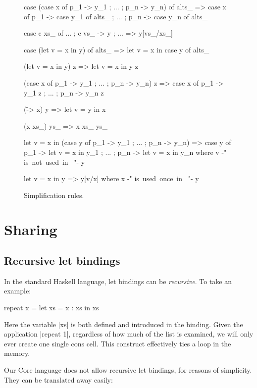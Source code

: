 \begin{figure}
\begin{code}
case (case x of {p_1 -> y_1 ; ... ; p_n -> y_n}) of alts_
    => case x of  {  p_1  -> case y_1 of alts_
                  ;  ...
                  ;  p_n  -> case y_n of alts_ }

case c xs_ of {... ; c vs_ -> y ; ...}
    => y[vs_/xs_]

case (let v = x in y) of alts_
    => let v = x in case y of alts_

(let v = x in y) z
    => let v = x in y z

(case x of {p_1 -> y_1 ; ... ; p_n -> y_n}) z
    => case x of {p_1 -> y_1 z ; ... ; p_n -> y_n z}

(\v -> x) y
    => let v = y in x

(x xs_) ys_
    => x xs_ ys_

let v = x in (case y of {p_1 -> y_1 ; ... ; p_n -> y_n})
    => case y of  {  p_1  -> let v = x in y_1
                  ;  ...
                  ;  p_n  -> let v = x in y_n}
    where v {-" \hbox{is not used in } "-} y

let v = x in y
    => y[v/x]
    where x {-" \hbox{is used once in } "-} y
\end{code}
\caption{Simplification rules.}
\label{fig:simplify}
\end{figure}



\section{Sharing}

\subsection{Recursive let bindings}

In the standard Haskell language, let bindings can be \textit{recursive}. To take an example:

\begin{code}
repeat x = let xs = x : xs
           in xs
\end{code}

Here the variable |xs| is both defined and introduced in the binding. Given the application |repeat 1|, regardless of how much of the list is examined, we will only ever create one single cons cell. This construct effectively ties a loop in the memory.

Our Core language does not allow recursive let bindings, for reasons of simplicity. They can be translated away easily:

